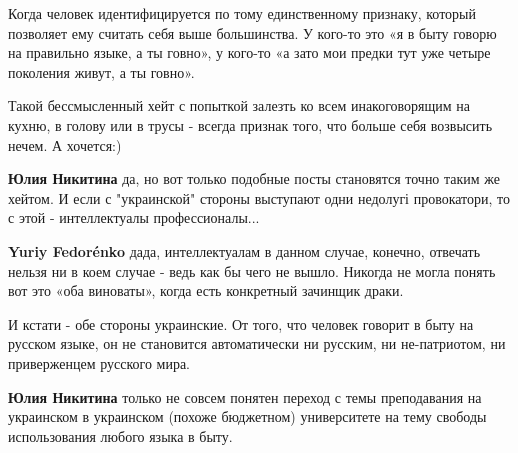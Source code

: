 \begin{itemize}
Когда человек идентифицируется по тому единственному признаку, который
позволяет ему считать себя выше большинства. У кого-то это «я в быту говорю на
правильно языке, а ты говно», у кого-то «а зато мои предки тут уже четыре
поколения живут, а ты говно». 

Такой бессмысленный хейт с попыткой залезть ко всем инакоговорящим на кухню, в
голову или в трусы - всегда признак того, что больше себя возвысить нечем. А
хочется:)

\begin{itemize}
 
\textbf{Юлия Никитина} да, но вот только подобные посты становятся точно таким же хейтом. И если с "украинской" стороны выступают одни недолугі провокатори, то с этой - интеллектуалы профессионалы...

 
\textbf{Yuriy Fedorénko} дада, интеллектуалам в данном случае, конечно, отвечать нельзя ни в коем случае - ведь как бы чего не вышло. Никогда не могла понять вот это «оба виноваты», когда есть конкретный зачинщик драки.

 
И кстати - обе стороны украинские. От того, что человек говорит в быту на русском языке, он не становится автоматически ни русским, ни не-патриотом, ни приверженцем русского мира.

 
\textbf{Юлия Никитина} только не совсем понятен переход с темы преподавания на украинском в украинском (похоже бюджетном) университете на тему свободы использования любого языка в быту.


\end{itemize}
\end{itemize}
